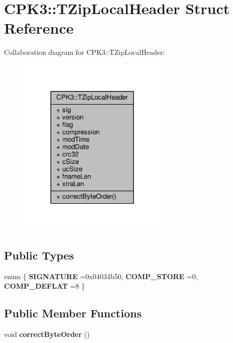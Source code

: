 \hypertarget{structCPK3_1_1TZipLocalHeader}{}\section{C\+P\+K3\+:\+:T\+Zip\+Local\+Header Struct Reference}
\label{structCPK3_1_1TZipLocalHeader}


Collaboration diagram for C\+P\+K3\+:\+:T\+Zip\+Local\+Header\+:
\nopagebreak
\begin{figure}[H]
\begin{center}
\leavevmode
\includegraphics[width=203pt]{d7/da4/structCPK3_1_1TZipLocalHeader__coll__graph}
\end{center}
\end{figure}
\subsection*{Public Types}
\begin{DoxyCompactItemize}
\item 
enum \{ {\bfseries S\+I\+G\+N\+A\+T\+U\+RE} =0x04034b50, 
{\bfseries C\+O\+M\+P\+\_\+\+S\+T\+O\+RE} =0, 
{\bfseries C\+O\+M\+P\+\_\+\+D\+E\+F\+L\+AT} =8
 \}\hypertarget{structCPK3_1_1TZipLocalHeader_a0270f19dabe252451a00461090b666e7}{}\label{structCPK3_1_1TZipLocalHeader_a0270f19dabe252451a00461090b666e7}

\end{DoxyCompactItemize}
\subsection*{Public Member Functions}
\begin{DoxyCompactItemize}
\item 
void {\bfseries correct\+Byte\+Order} ()\hypertarget{structCPK3_1_1TZipLocalHeader_ae04506fc0b1ebd8cb89268c68670eeae}{}\label{structCPK3_1_1TZipLocalHeader_ae04506fc0b1ebd8cb89268c68670eeae}

\end{DoxyCompactItemize}
